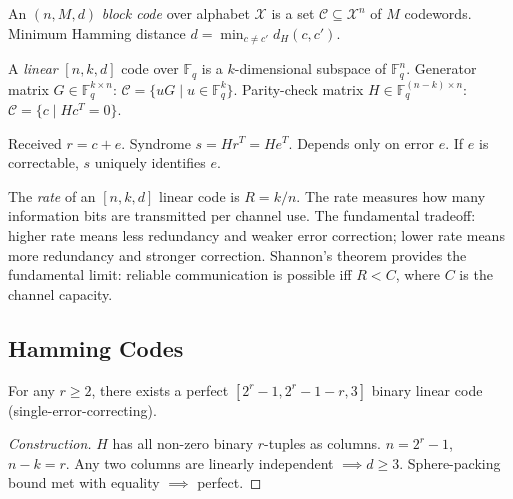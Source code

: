 \begin{definition}
An $(n, M, d)$ \emph{block code} over alphabet $\mathcal{X}$ is a set $\mathcal{C} \subseteq \mathcal{X}^n$ of $M$ codewords. Minimum Hamming distance $d = \min_{c \neq c'} d_H(c, c')$.
\end{definition}

\begin{definition}
A \emph{linear} $[n, k, d]$ code over $\mathbb{F}_q$ is a $k$-dimensional subspace of $\mathbb{F}_q^n$. Generator matrix $G \in \mathbb{F}_q^{k \times n}$: $\mathcal{C} = \{ uG \mid u \in \mathbb{F}_q^k \}$. Parity-check matrix $H \in \mathbb{F}_q^{(n-k) \times n}$: $\mathcal{C} = \{ c \mid H c^T = 0 \}$.
\end{definition}

\begin{definition}
Received $r = c + e$. Syndrome $s = H r^T = H e^T$. Depends only on error $e$. If $e$ is correctable, $s$ uniquely identifies $e$.
\end{definition}

\begin{definition}
The \emph{rate} of an $[n,k,d]$ linear code is $R = k/n$. The rate measures how many information bits are transmitted per channel use. The fundamental tradeoff: higher rate means less redundancy and weaker error correction; lower rate means more redundancy and stronger correction. Shannon's theorem provides the fundamental limit: reliable communication is possible iff $R < C$, where $C$ is the channel capacity.
\end{definition}

\subsection{Hamming Codes}
\label{sec:ec:hamming}

\begin{theorem}
For any $r \ge 2$, there exists a perfect $[2^r-1, 2^r-1-r, 3]$ binary linear code (single-error-correcting).
\end{theorem}

\begin{proof}[Construction]
$H$ has all non-zero binary $r$-tuples as columns. $n = 2^r-1$, $n-k = r$. Any two columns are linearly independent $\implies d \ge 3$. Sphere-packing bound met with equality $\implies$ perfect.
\end{proof}

